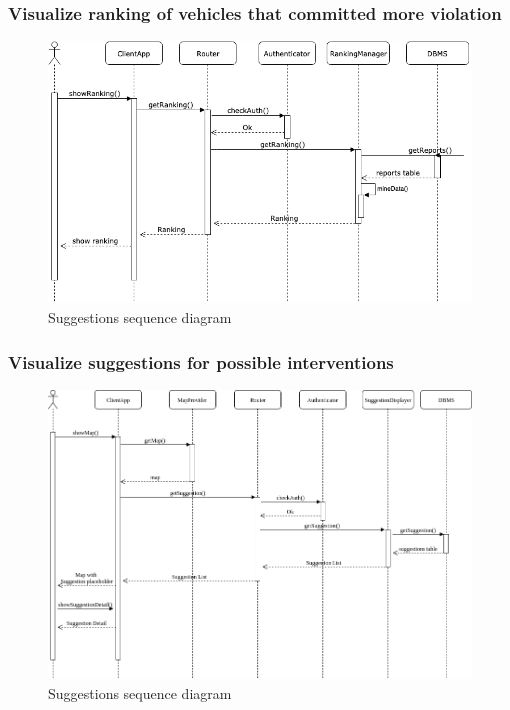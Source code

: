 \documentclass{article}
\begin{document}
\newpage
\subsubsection{Visualize ranking of vehicles that committed more violation}
\begin{figure}[ht]
\centering
	\includegraphics[width=1.0\textwidth]{images/ranking-sequence.png}
	\caption{Suggestions sequence diagram}
	\label{fig:ranking-sequence}
\end{figure}

\newpage
\subsubsection{Visualize suggestions for possible interventions}
\begin{figure}[ht]
\centering
	\includegraphics[width=1.0\textwidth]{images/visualize-suggestion-sequence.png}
	\caption{Suggestions sequence diagram}
	\label{fig:visualize-suggestion-sequence}
\end{figure}
\end{document}

